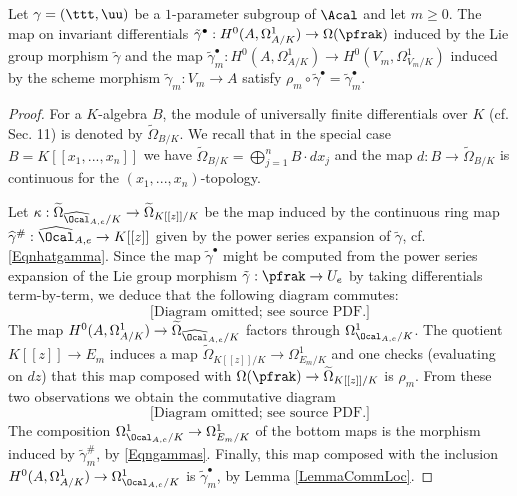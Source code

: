 \begin{lemma}
\notready \label{LemmaCompatibility} Let $\gamma=(\ttt,\uu)$ be a $1$-parameter subgroup of $\Acal$ and let $m\ge 0$. The map on invariant differentials $\tilde{\gamma}^\bullet : H^0(A,\Omega^1_{A/K})\to \Omega(\pfrak)$ induced by the Lie group morphism $\tilde{\gamma}$ and the map $\tilde{\gamma}_m^\bullet : H^0(A,\Omega^1_{A/K})\to H^0(V_m,\Omega^1_{V_m/K})$ induced by the scheme morphism $\tilde{\gamma}_m:V_m\to A$ satisfy $\rho_m\circ \tilde{\gamma}^\bullet=\tilde{\gamma}_m^\bullet$.
\end{lemma}
\begin{proof} For a $K$-algebra $B$, the module of universally finite differentials over $K$ (cf. \cite{KunzDiff} Sec. 11) is denoted by $\widetilde{\Omega}_{B/K}$. We recall that in the special case $B=K[[x_1,...,x_n]]$ we have $\widetilde{\Omega}_{B/K}=\bigoplus_{j=1}^n B\cdot dx_j$ and the map $d:B\to \widetilde{\Omega}_{B/K}$ is continuous for the $(x_1,...,x_n)$-topology.

Let $\kappa:\widetilde{\Omega}_{\widehat{\Ocal}_{A,e}/K}\to \widetilde{\Omega}_{K[[z]]/K}$ be the map induced by the continuous ring map $\widehat{\gamma}^\# : \widehat{\Ocal}_{A,e}\to K[[z]]$ given by the power series expansion of $\tilde{\gamma}$, cf. \eqref{Eqnhatgamma}. Since the map $\tilde{\gamma}^\bullet$ might be computed from the power series expansion of the Lie group morphism $\tilde{\gamma}: \pfrak\to U_e$ by taking differentials term-by-term, we deduce that the following diagram commutes:
$$
\text{[Diagram omitted; see source PDF.]}
$$
The map $H^0(A,\Omega^1_{A/K})\to \widetilde{\Omega}_{\widehat{\Ocal}_{A,e}/K}$ factors through $\Omega^1_{\Ocal_{A,e}/K}$. The quotient $K[[z]]\to E_m$ induces a map $\widetilde{\Omega}_{K[[z]]/K}\to \Omega^1_{E_m/K}$ and one checks (evaluating on $dz$) that this map composed with $\Omega(\pfrak)\to \widetilde{\Omega}_{K[[z]]/K}$ is $\rho_m$. From these two observations we obtain the commutative diagram
$$
\text{[Diagram omitted; see source PDF.]}
$$
The composition $\Omega^1_{\Ocal_{A,e}/K}\to \Omega^1_{E_m/K}$ of the bottom maps is the morphism induced by $\tilde{\gamma}^\#_m$, by \eqref{Eqngammas}. Finally, this map composed with the inclusion $H^0(A,\Omega^1_{A/K})\to \Omega^1_{\Ocal_{A,e}/K}$ is $\tilde{\gamma}^\bullet_m$, by Lemma \ref{LemmaCommLoc}.
\end{proof}


